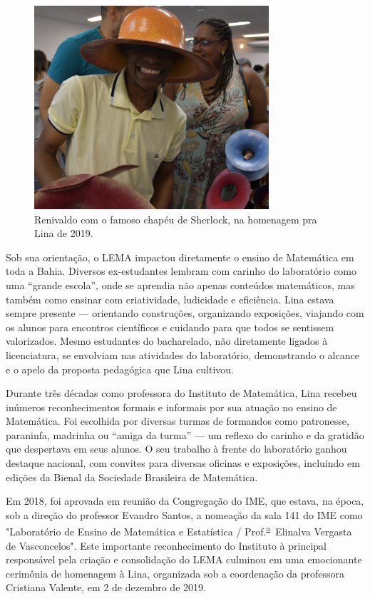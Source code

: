 \documentclass{hipatia}
\newcommand{\superau}{\textsuperscript{\underline{a}}~}
\begin{document}
\begin{figure}[htb!]
\includegraphics[width=8.7cm]{Reni.jpg}
\caption{Renivaldo com o famoso chapéu de Sherlock, na homenagem pra Lina de 2019.}   
\end{figure}


Sob sua orientação, o LEMA impactou diretamente o ensino de Matemática em toda a Bahia. Diversos ex-estudantes lembram com carinho do laboratório como uma “grande escola”, onde se aprendia não apenas conteúdos matemáticos, mas também como ensinar com criatividade, ludicidade e eficiência. Lina estava sempre presente — orientando construções, organizando exposições, viajando com os alunos para encontros científicos e cuidando para que todos se sentissem valorizados. Mesmo estudantes do bacharelado, não diretamente ligados à licenciatura, se envolviam nas atividades do laboratório, demonstrando o alcance e o apelo da proposta pedagógica que Lina cultivou. 


Durante três décadas como professora do Instituto de Matemática, Lina recebeu inúmeros reconhecimentos formais e informais por sua atuação no ensino de Matemática. Foi escolhida por diversas turmas de formandos como patronesse, paraninfa, madrinha ou “amiga da turma” — um reflexo do carinho e da gratidão que despertava em seus alunos. O seu trabalho à frente do laboratório ganhou destaque nacional, com convites para diversas oficinas e exposições, incluindo em edições da Bienal da Sociedade Brasileira de Matemática.  


Em 2018, foi aprovada em reunião da Congregação do IME, que estava, na época,  sob a direção do professor Evandro Santos, a nomeação da sala 141 do IME como "Laboratório de Ensino de Matemática e Estatística / Prof.\superau Elinalva Vergasta de Vasconcelos". Este importante reconhecimento do Instituto à principal responsável pela criação e consolidação do LEMA culminou em uma emocionante cerimônia de homenagem à Lina, organizada sob a coordenação da professora Cristiana Valente, em 2 de dezembro de 2019.
\end{document}
